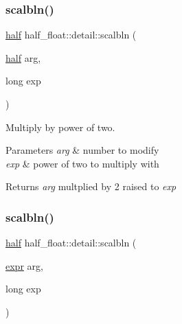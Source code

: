 \subsubsection{\texorpdfstring{scalbln()}{scalbln()}\hspace{0.1cm}{\footnotesize\ttfamily [1/2]}}
{\footnotesize\ttfamily \hyperlink{classhalf__float_1_1half}{half} half\+\_\+float\+::detail\+::scalbln (\begin{DoxyParamCaption}\item[{\hyperlink{classhalf__float_1_1half}{half}}]{arg,  }\item[{long}]{exp }\end{DoxyParamCaption})\hspace{0.3cm}{\ttfamily [inline]}}

Multiply by power of two. 
\begin{DoxyParams}{Parameters}
{\em arg} & number to modify \\
\hline
{\em exp} & power of two to multiply with \\
\hline
\end{DoxyParams}
\begin{DoxyReturn}{Returns}
{\itshape arg} multplied by 2 raised to {\itshape exp} 
\end{DoxyReturn}
\mbox{\label{namespacehalf__float_1_1detail_a5466f8ca5b1bc5df9326c250b8f1bf2c}} 
\subsubsection{\texorpdfstring{scalbln()}{scalbln()}\hspace{0.1cm}{\footnotesize\ttfamily [2/2]}}
{\footnotesize\ttfamily \hyperlink{classhalf__float_1_1half}{half} half\+\_\+float\+::detail\+::scalbln (\begin{DoxyParamCaption}\item[{\hyperlink{structhalf__float_1_1detail_1_1expr}{expr}}]{arg,  }\item[{long}]{exp }\end{DoxyParamCaption})\hspace{0.3cm}{\ttfamily [inline]}}

\mbox{\label{namespacehalf__float_1_1detail_afa69fde98551e3537a77d267b1fc4187}} 
